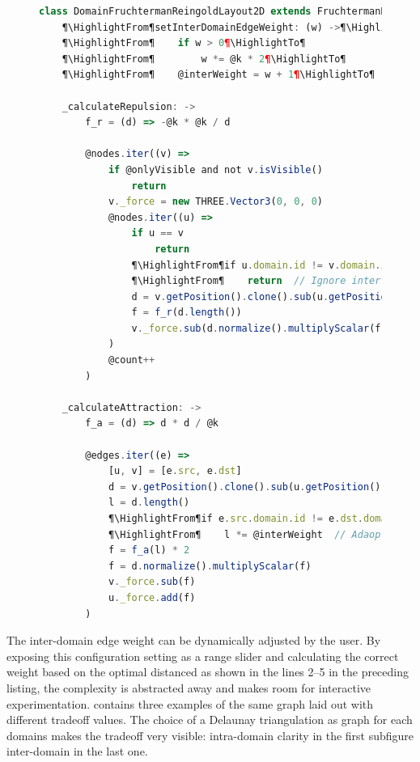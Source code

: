 \begin{figure}
\begin{lstlisting}[caption={Implementation of the 2D Domain Fruchterman-Reingold layout algorithm.},label=lst:domain-fr,language=javascript]
class DomainFruchtermanReingoldLayout2D extends FruchtermanReingoldLayout2D
    ¶\HighlightFrom¶setInterDomainEdgeWeight: (w) ->¶\HighlightTo¶
    ¶\HighlightFrom¶    if w > 0¶\HighlightTo¶
    ¶\HighlightFrom¶        w *= @k * 2¶\HighlightTo¶
    ¶\HighlightFrom¶    @interWeight = w + 1¶\HighlightTo¶

    _calculateRepulsion: ->
        f_r = (d) => -@k * @k / d

        @nodes.iter((v) =>
            if @onlyVisible and not v.isVisible()
                return
            v._force = new THREE.Vector3(0, 0, 0)
            @nodes.iter((u) =>
                if u == v
                    return
                ¶\HighlightFrom¶if u.domain.id != v.domain.id¶\HighlightTo¶
                ¶\HighlightFrom¶    return  // Ignore inter-domain repulsive forces¶\HighlightTo¶
                d = v.getPosition().clone().sub(u.getPosition())
                f = f_r(d.length())
                v._force.sub(d.normalize().multiplyScalar(f))
            )
            @count++
        )

    _calculateAttraction: ->
        f_a = (d) => d * d / @k

        @edges.iter((e) =>
            [u, v] = [e.src, e.dst]
            d = v.getPosition().clone().sub(u.getPosition())
            l = d.length()
            ¶\HighlightFrom¶if e.src.domain.id != e.dst.domain.id¶\HighlightTo¶
            ¶\HighlightFrom¶    l *= @interWeight  // Adaopt weight of inter-domain edges¶\HighlightTo¶
            f = f_a(l) * 2
            f = d.normalize().multiplyScalar(f)
            v._force.sub(f)
            u._force.add(f)
        )
\end{lstlisting}
\end{figure}

The inter-domain edge weight can be dynamically adjusted by the user. By exposing this configuration setting as a range slider and calculating the correct weight based on the optimal distanced as shown in the lines 2--5 in the preceding listing, the complexity is abstracted away and makes room for interactive experimentation.  contains three examples of the same graph laid out with different tradeoff values. The choice of a Delaunay triangulation as graph for each domains makes the tradeoff very visible: intra-domain clarity in the first subfigure inter-domain in the last one.

